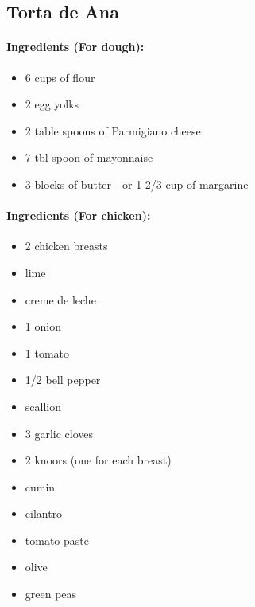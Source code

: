 \documentclass{article}
\begin{document}
\subsection{Torta de Ana}

\paragraph{Ingredients (For dough):}

\begin{itemize}
	\item 6 cups of flour
	\item 2 egg yolks
	\item 2 table spoons of Parmigiano cheese
	\item 7 tbl spoon of mayonnaise
	\item 3 blocks of butter - or 1 2/3 cup of margarine
\end{itemize}

\paragraph{Ingredients (For chicken):}

\begin{itemize}
	\item 2 chicken breasts
	\item lime
	\item creme de leche
	\item 1 onion
	\item 1 tomato
	\item 1/2 bell pepper
	\item scallion
	\item 3 garlic cloves
	\item 2 knoors (one for each breast)
	\item cumin
	\item cilantro
	\item tomato paste
	\item olive
	\item green peas
\end{itemize}
\end{document}
